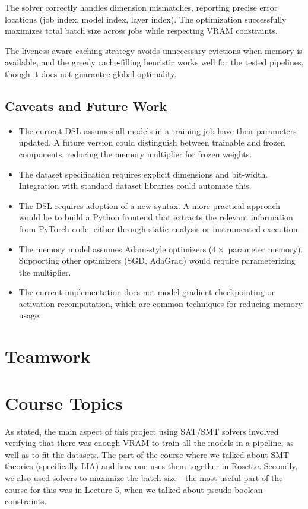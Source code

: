 \documentclass{nfr}
\begin{document}
The solver correctly handles dimension mismatches, reporting precise error locations (job index, model index, layer index). The optimization successfully maximizes total batch size across jobs while respecting VRAM constraints.

The liveness-aware caching strategy avoids unnecessary evictions when memory is available, and the greedy cache-filling heuristic works well for the tested pipelines, though it does not guarantee global optimality.

\subsection{Caveats and Future Work}
\begin{itemize}
    \item The current DSL assumes all models in a training job have their parameters updated. A future version could distinguish between trainable and frozen components, reducing the memory multiplier for frozen weights.
    \item The dataset specification requires explicit dimensions and bit-width. Integration with standard dataset libraries could automate this.
    \item The DSL requires adoption of a new syntax. A more practical approach would be to build a Python frontend that extracts the relevant information from PyTorch code, either through static analysis or instrumented execution.
    \item The memory model assumes Adam-style optimizers ($4\times$ parameter memory). Supporting other optimizers (SGD, AdaGrad) would require parameterizing the multiplier.
    \item The current implementation does not model gradient checkpointing or activation recomputation, which are common techniques for reducing memory usage.
\end{itemize}

\section{Teamwork}
\section{Course Topics}

As stated, the main aspect of this project using SAT/SMT solvers involved verifying that there was enough VRAM to train all the models in a pipeline, as well as to fit the datasets. The part of the course where we talked about SMT theories (specifically LIA) and how one uses them together in Rosette. Secondly, we also used solvers to maximize the batch size - the most useful part of the course for this was in Lecture 5, when we talked about pseudo-boolean constraints.

\newpage


\end{document}
